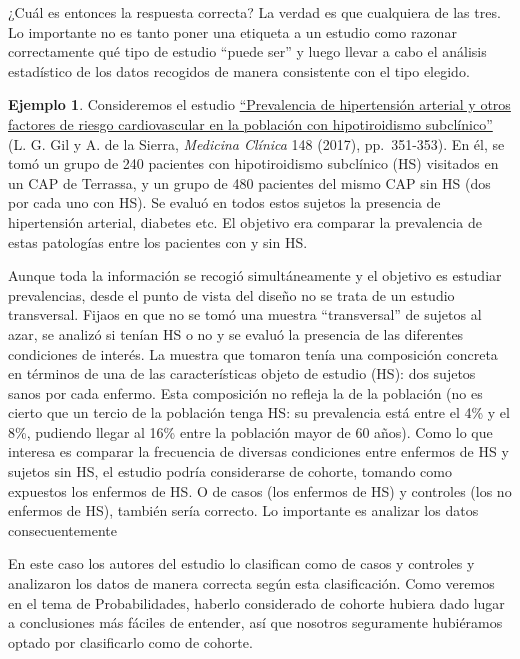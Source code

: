 \documentclass[
]{book}
\theoremstyle{definition}
\theoremstyle{definition}
\newtheorem{example}{Ejemplo}[chapter]
\theoremstyle{definition}
\theoremstyle{definition}
\theoremstyle{remark}
\begin{document}
\begin{rmdimportant}
¿Cuál es entonces la respuesta correcta? La verdad es que cualquiera de las tres. Lo importante no es tanto poner una etiqueta a un estudio como razonar correctamente qué tipo de estudio ``puede ser'' y luego llevar a cabo el análisis estadístico de los datos recogidos de manera consistente con el tipo elegido.
\end{rmdimportant}

\begin{example}
\protect\hypertarget{exm:HS}{}\label{exm:HS}Consideremos el estudio \href{https://www.sciencedirect.com/science/article/pii/S0025775316305759}{``Prevalencia de hipertensión arterial y otros factores de riesgo cardiovascular en la población con hipotiroidismo subclínico''} (L. G. Gil y A. de la Sierra, \emph{Medicina Clínica} 148 (2017), pp.~351-353). En él, se tomó un grupo de 240 pacientes con hipotiroidismo subclínico (HS) visitados en un CAP de Terrassa, y un grupo de 480 pacientes del mismo CAP sin HS (dos por cada uno con HS). Se evaluó en todos estos sujetos la presencia de hipertensión arterial, diabetes etc. El objetivo era comparar la prevalencia de estas patologías entre los pacientes con y sin HS.
\end{example}

Aunque toda la información se recogió simultáneamente y el objetivo es estudiar prevalencias, desde el punto de vista del diseño no se trata de un estudio transversal. Fijaos en que no se tomó una muestra ``transversal'' de sujetos al azar, se analizó si tenían HS o no y se evaluó la presencia de las diferentes condiciones de interés. La muestra que tomaron tenía una composición concreta en términos de una de las características objeto de estudio (HS): dos sujetos sanos por cada enfermo. Esta composición no refleja la de la población (no es cierto que un tercio de la población tenga HS: su prevalencia está entre el 4\% y el 8\%, pudiendo llegar al 16\% entre la población mayor de 60 años). Como lo que interesa es comparar la frecuencia de diversas condiciones entre enfermos de HS y sujetos sin HS, el estudio podría considerarse de cohorte, tomando como expuestos los enfermos de HS. O de casos (los enfermos de HS) y controles (los no enfermos de HS), también sería correcto. Lo importante es analizar los datos consecuentemente

En este caso los autores del estudio lo clasifican como de casos y controles y analizaron los datos de manera correcta según esta clasificación. Como veremos en el tema de Probabilidades, haberlo considerado de cohorte hubiera dado lugar a conclusiones más fáciles de entender, así que nosotros seguramente hubiéramos optado por clasificarlo como de cohorte.
\end{document}
